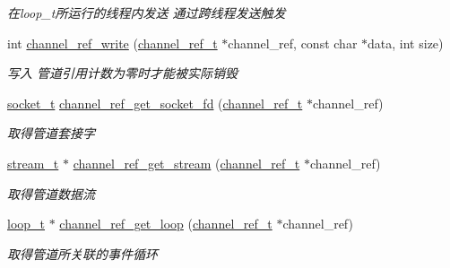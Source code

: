 \begin{DoxyCompactItemize}
\begin{DoxyCompactList}\small\item\em 在loop\+\_\+t所运行的线程内发送 通过跨线程发送触发 \end{DoxyCompactList}\item 
int \hyperlink{a00041_a0688f00d64ff34ae18fd4a354d890029_a0688f00d64ff34ae18fd4a354d890029}{channel\+\_\+ref\+\_\+write} (\hyperlink{a00044_a151271c9d188ef28d4d24bb81dcc1263_a151271c9d188ef28d4d24bb81dcc1263}{channel\+\_\+ref\+\_\+t} $\ast$channel\+\_\+ref, const char $\ast$data, int size)
\begin{DoxyCompactList}\small\item\em 写入 管道引用计数为零时才能被实际销毁 \end{DoxyCompactList}\item 
\hyperlink{a00044_a0d9e0afbf02fb6ed6c5b1415dce51b05_a0d9e0afbf02fb6ed6c5b1415dce51b05}{socket\+\_\+t} \hyperlink{a00084_gaf0c977ef05b7e767a8ef166a8037ec8b_gaf0c977ef05b7e767a8ef166a8037ec8b}{channel\+\_\+ref\+\_\+get\+\_\+socket\+\_\+fd} (\hyperlink{a00044_a151271c9d188ef28d4d24bb81dcc1263_a151271c9d188ef28d4d24bb81dcc1263}{channel\+\_\+ref\+\_\+t} $\ast$channel\+\_\+ref)
\begin{DoxyCompactList}\small\item\em 取得管道套接字 \end{DoxyCompactList}\item 
\hyperlink{a00044_a261dba04f46f5c59a68a05f69f5a65a8_a261dba04f46f5c59a68a05f69f5a65a8}{stream\+\_\+t} $\ast$ \hyperlink{a00084_gaf8d2758e1e063e04512049c9a9869d5e_gaf8d2758e1e063e04512049c9a9869d5e}{channel\+\_\+ref\+\_\+get\+\_\+stream} (\hyperlink{a00044_a151271c9d188ef28d4d24bb81dcc1263_a151271c9d188ef28d4d24bb81dcc1263}{channel\+\_\+ref\+\_\+t} $\ast$channel\+\_\+ref)
\begin{DoxyCompactList}\small\item\em 取得管道数据流 \end{DoxyCompactList}\item 
\hyperlink{a00044_a9c3ad1cd2de83e09f3a7b59fa82c94ee_a9c3ad1cd2de83e09f3a7b59fa82c94ee}{loop\+\_\+t} $\ast$ \hyperlink{a00084_gad840fd786ca7092d528a8fc45c2e2a76_gad840fd786ca7092d528a8fc45c2e2a76}{channel\+\_\+ref\+\_\+get\+\_\+loop} (\hyperlink{a00044_a151271c9d188ef28d4d24bb81dcc1263_a151271c9d188ef28d4d24bb81dcc1263}{channel\+\_\+ref\+\_\+t} $\ast$channel\+\_\+ref)
\begin{DoxyCompactList}\small\item\em 取得管道所关联的事件循环 \end{DoxyCompactList}\item 

\end{DoxyCompactItemize}
